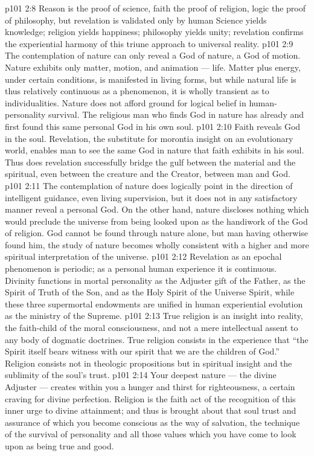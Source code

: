 \vs p101 2:8 \pc Reason is the proof of science, faith the proof of religion, logic the proof of philosophy, but revelation is validated only by human  Science yields knowledge; religion yields happiness; philosophy yields unity; revelation confirms the experiential harmony of this triune approach to universal reality.
\vs p101 2:9 The contemplation of nature can only reveal a God of nature, a God of motion. Nature exhibits only matter, motion, and animation --- life. Matter plus energy, under certain conditions, is manifested in living forms, but while natural life is thus relatively continuous as a phenomenon, it is wholly transient as to individualities. Nature does not afford ground for logical belief in human\hyp{}personality survival. The religious man who finds God in nature has already and first found this same personal God in his own soul.
\vs p101 2:10 \pc Faith reveals God in the soul. Revelation, the substitute for morontia insight on an evolutionary world, enables man to see the same God in nature that faith exhibits in his soul. Thus does revelation successfully bridge the gulf between the material and the spiritual, even between the creature and the Creator, between man and God.
\vs p101 2:11 The contemplation of nature does logically point in the direction of intelligent guidance, even living supervision, but it does not in any satisfactory manner reveal a personal God. On the other hand, nature discloses nothing which would preclude the universe from being looked upon as the handiwork of the God of religion. God cannot be found through nature alone, but man having otherwise found him, the study of nature becomes wholly consistent with a higher and more spiritual interpretation of the universe.
\vs p101 2:12 \pc Revelation as an epochal phenomenon is periodic; as a personal human experience it is continuous. Divinity functions in mortal personality as the Adjuster gift of the Father, as the Spirit of Truth of the Son, and as the Holy Spirit of the Universe Spirit, while these three supermortal endowments are unified in human experiential evolution as the ministry of the Supreme.
\vs p101 2:13 True religion is an insight into reality, the faith\hyp{}child of the moral consciousness, and not a mere intellectual assent to any body of dogmatic doctrines. True religion consists in the experience that “the Spirit itself bears witness with our spirit that we are the children of God.” Religion consists not in theologic propositions but in spiritual insight and the sublimity of the soul’s trust.
\vs p101 2:14 Your deepest nature --- the divine Adjuster --- creates within you a hunger and thirst for righteousness, a certain craving for divine perfection. Religion is the faith act of the recognition of this inner urge to divine attainment; and thus is brought about that soul trust and assurance of which you become conscious as the way of salvation, the technique of the survival of personality and all those values which you have come to look upon as being true and good.
